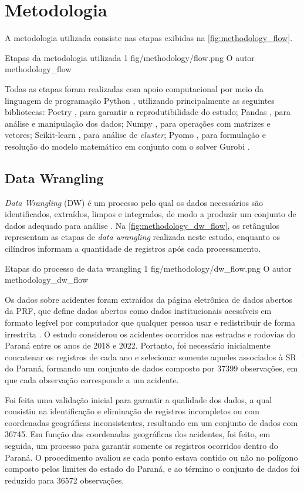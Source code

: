 \chapter{Metodologia}

A metodologia utilizada consiste nas etapas exibidas na \autoref{fig:methodology_flow}. 

\figura
{Etapas da metodologia utilizada}
{1}
{fig/methodology/flow.png}
{O autor}
{methodology_flow}
{}
{}

Todas as etapas foram realizadas com apoio computacional por meio da linguagem de programação Python \cite{python}, utilizando principalmente as seguintes bibliotecas: Poetry \cite{poetry}, para garantir a reprodutibilidade do estudo; Pandas \cite{pandas}, para análise e manipulação dos dados; Numpy  \cite{numpy}, para operações com matrizes e vetores; Scikit-learn \cite{scikit-learn}, para análise de \textit{cluster}; Pyomo \cite{pyomo_book, pyomo_paper}, para formulação e resolução do modelo matemático em conjunto com o solver Gurobi \cite{gurobi}.

\section{Data Wrangling}

\textit{Data Wrangling} (DW) é um processo pelo qual os dados necessários são identificados, extraídos, limpos e integrados, de modo a produzir um conjunto de dados adequado para análise \cite{Furche2016}. Na \autoref{fig:methodology_dw_flow}, os retângulos representam as etapas de \textit{data wrangling} realizada neste estudo, enquanto os cilíndros informam a quantidade de registros após cada processamento.

\figura
{Etapas do processo de data wrangling}
{1}
{fig/methodology/dw_flow.png}
{O autor}
{methodology_dw_flow}
{}
{}

Os dados sobre acidentes foram extraídos da página eletrônica de dados abertos da PRF, que define dados abertos como dados institucionais acessíveis em formato legível por computador que qualquer pessoa usar e redistribuir de forma irrestrita \cite{DadosPRF}. O estudo considerou os acidentes ocorridos nas estradas e rodovias do Paraná entre os anos de 2018 e 2022. Portanto, foi necessário inicialmente concatenar os registros de cada ano e selecionar somente aqueles associados à SR do Paraná, formando um conjunto de dados composto por 37399 observações, em que cada observação corresponde a um acidente.

Foi feita uma validação inicial para garantir a qualidade dos dados, a qual consistiu na identificação e eliminação de registros incompletos ou com coordenadas geográficas inconsistentes, resultando em um conjunto de dados com 36745. Em função das coordenadas geográficas dos acidentes, foi feito, em seguida, um processo para garantir somente os registros ocorridos dentro do Paraná. O procedimento avaliou se cada ponto estava contido ou não no polígono composto pelos limites do estado do Paraná, e ao término o conjunto de dados foi reduzido para 36572 observações. 


